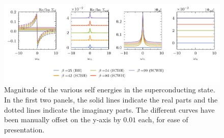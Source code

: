 





\begin{figure}[t!]
    \centering
    \includegraphics[width=\linewidth]{figures/chapter3/MagnitudeSEs.pdf}
    \caption{Magnitude of the various self energies in the superconducting state. In the first two panels, the solid lines indicate the real parts and the dotted lines indicate the imaginary parts. The different curves have been manually offset on the y-axis by $0.01$ each, for ease of presentation.}
    \label{fig:MagnitudeSelfEnergies}
\end{figure}




